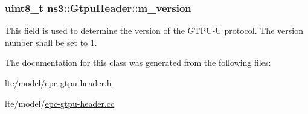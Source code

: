 \subsubsection[{\texorpdfstring{m\+\_\+version}{m_version}}]{\setlength{\rightskip}{0pt plus 5cm}uint8\+\_\+t ns3\+::\+Gtpu\+Header\+::m\+\_\+version\hspace{0.3cm}{\ttfamily [private]}}\hypertarget{classns3_1_1GtpuHeader_ab0bd6fd08e361f9bb35ce1160bf8b263}{}\label{classns3_1_1GtpuHeader_ab0bd6fd08e361f9bb35ce1160bf8b263}
This field is used to determine the version of the G\+T\+P\+U-\/U protocol. The version number shall be set to 1. 

The documentation for this class was generated from the following files\+:\begin{DoxyCompactItemize}
\item 
lte/model/\hyperlink{epc-gtpu-header_8h}{epc-\/gtpu-\/header.\+h}\item 
lte/model/\hyperlink{epc-gtpu-header_8cc}{epc-\/gtpu-\/header.\+cc}\end{DoxyCompactItemize}
